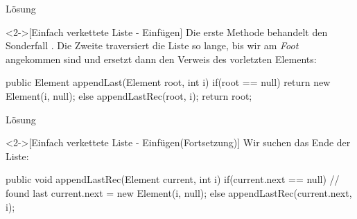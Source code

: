 \begin{frame}[fragile,c]{Lösung}
    \begin{solve}<2->[Einfach verkettete Liste - Einfügen]
        Die erste Methode behandelt den Sonderfall . Die Zweite traversiert die Liste so lange,\pause{} bis wir am \emph{Foot} angekommen sind und ersetzt dann den Verweis des vorletzten Elements:\pause{}
\begin{plainjava}
public Element appendLast(Element root, int i) {
    if(root == null) {
        return new Element(i, null);
    } else {
        appendLastRec(root, i);
        return root;
    }
}
\end{plainjava}
    \end{solve}
\end{frame}

\begin{frame}[fragile,c]{Lösung}
    \addtocounter{solve}{-1}%
    \begin{solve}<2->[Einfach verkettete Liste - Einfügen\hfill{}(Fortsetzung)]
        Wir suchen das Ende der Liste:
\begin{plainjava}
public void appendLastRec(Element current, int i){
    if(current.next == null) // found last
        current.next = new Element(i, null);
    else
        appendLastRec(current.next, i);
}
\end{plainjava}
    \end{solve}
\end{frame}
\fi

\def\Element#1{{\renewcommand{\arraystretch}{1.4}%
    \begin{tabular}{|p{1em}|>{\centering}p{1em}|p{1em}|}
        \hline
            & \strut#1 & \\
        \hline
    \end{tabular}%
}}

